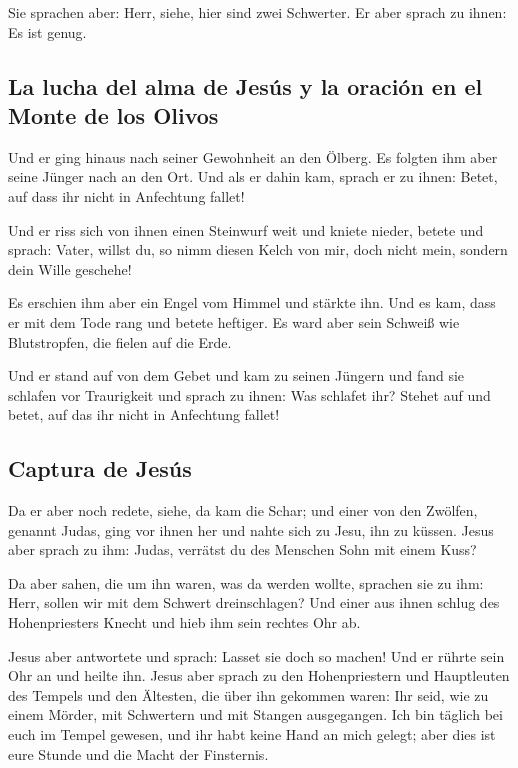  Sie sprachen aber: Herr, siehe, hier sind zwei
Schwerter. Er aber sprach zu ihnen: Es ist genug.

\hypertarget{la-lucha-del-alma-de-jesuxfas-y-la-oraciuxf3n-en-el-monte-de-los-olivos}{%
\subsection{La lucha del alma de Jesús y la oración en el Monte de los
Olivos}\label{la-lucha-del-alma-de-jesuxfas-y-la-oraciuxf3n-en-el-monte-de-los-olivos}}

 Und er ging hinaus nach seiner Gewohnheit an den Ölberg.
Es folgten ihm aber seine Jünger nach an den Ort.  Und
als er dahin kam, sprach er zu ihnen: Betet, auf dass ihr nicht in
Anfechtung fallet!

 Und er riss sich von ihnen einen Steinwurf weit und
kniete nieder, betete  und sprach: Vater, willst du, so
nimm diesen Kelch von mir, doch nicht mein, sondern dein Wille geschehe!

 Es erschien ihm aber ein Engel vom Himmel und stärkte
ihn.  Und es kam, dass er mit dem Tode rang und betete
heftiger. Es ward aber sein Schweiß wie Blutstropfen, die fielen auf die
Erde.

 Und er stand auf von dem Gebet und kam zu seinen Jüngern
und fand sie schlafen vor Traurigkeit  und sprach zu
ihnen: Was schlafet ihr? Stehet auf und betet, auf das ihr nicht in
Anfechtung fallet!

\hypertarget{captura-de-jesuxfas}{%
\subsection{Captura de Jesús}\label{captura-de-jesuxfas}}

 Da er aber noch redete, siehe, da kam die Schar; und
einer von den Zwölfen, genannt Judas, ging vor ihnen her und nahte sich
zu Jesu, ihn zu küssen.  Jesus aber sprach zu ihm: Judas,
verrätst du des Menschen Sohn mit einem Kuss?

 Da aber sahen, die um ihn waren, was da werden wollte,
sprachen sie zu ihm: Herr, sollen wir mit dem Schwert dreinschlagen?
 Und einer aus ihnen schlug des Hohenpriesters Knecht und
hieb ihm sein rechtes Ohr ab.

 Jesus aber antwortete und sprach: Lasset sie doch so
machen! Und er rührte sein Ohr an und heilte ihn.  Jesus
aber sprach zu den Hohenpriestern und Hauptleuten des Tempels und den
Ältesten, die über ihn gekommen waren: Ihr seid, wie zu einem Mörder,
mit Schwertern und mit Stangen ausgegangen.  Ich bin
täglich bei euch im Tempel gewesen, und ihr habt keine Hand an mich
gelegt; aber dies ist eure Stunde und die Macht der Finsternis.

